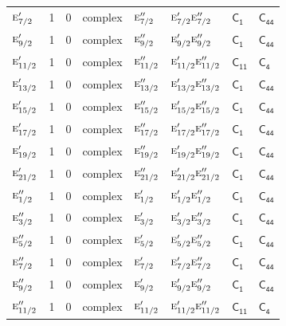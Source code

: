 \documentclass[10pt,a4paper]{article}
\numberwithin{equation}{section}
\newcommand{\grp}[1]{\mathsf{#1}}
\newcommand{\irr}[1]{\text{\normalfont\scshape #1}}
\begin{document}
{\begin{longtable}{@{}lrrlllll@{}}
$\irr{e}_{7/2}'$ & 1 & $0$ & complex & $\irr{e}_{7/2}''$ & $\irr{e}_{7/2}'\irr{e}_{7/2}''$ & \href{C1.pdf}{$\grp{C_{1}}$} & $\grp{C_{44}}$\\
$\irr{e}_{9/2}'$ & 1 & $0$ & complex & $\irr{e}_{9/2}''$ & $\irr{e}_{9/2}'\irr{e}_{9/2}''$ & \href{C1.pdf}{$\grp{C_{1}}$} & $\grp{C_{44}}$\\
$\irr{e}_{11/2}'$ & 1 & $0$ & complex & $\irr{e}_{11/2}''$ & $\irr{e}_{11/2}'\irr{e}_{11/2}''$ & \href{C11.pdf}{$\grp{C_{11}}$} & \href{../../../rotation/data/pdf/C4.pdf}{$\grp{C_{4}}$}\\
$\irr{e}_{13/2}'$ & 1 & $0$ & complex & $\irr{e}_{13/2}''$ & $\irr{e}_{13/2}'\irr{e}_{13/2}''$ & \href{C1.pdf}{$\grp{C_{1}}$} & $\grp{C_{44}}$\\
$\irr{e}_{15/2}'$ & 1 & $0$ & complex & $\irr{e}_{15/2}''$ & $\irr{e}_{15/2}'\irr{e}_{15/2}''$ & \href{C1.pdf}{$\grp{C_{1}}$} & $\grp{C_{44}}$\\
$\irr{e}_{17/2}'$ & 1 & $0$ & complex & $\irr{e}_{17/2}''$ & $\irr{e}_{17/2}'\irr{e}_{17/2}''$ & \href{C1.pdf}{$\grp{C_{1}}$} & $\grp{C_{44}}$\\
$\irr{e}_{19/2}'$ & 1 & $0$ & complex & $\irr{e}_{19/2}''$ & $\irr{e}_{19/2}'\irr{e}_{19/2}''$ & \href{C1.pdf}{$\grp{C_{1}}$} & $\grp{C_{44}}$\\
$\irr{e}_{21/2}'$ & 1 & $0$ & complex & $\irr{e}_{21/2}''$ & $\irr{e}_{21/2}'\irr{e}_{21/2}''$ & \href{C1.pdf}{$\grp{C_{1}}$} & $\grp{C_{44}}$\\
$\irr{e}_{1/2}''$ & 1 & $0$ & complex & $\irr{e}_{1/2}'$ & $\irr{e}_{1/2}'\irr{e}_{1/2}''$ & \href{C1.pdf}{$\grp{C_{1}}$} & $\grp{C_{44}}$\\
$\irr{e}_{3/2}''$ & 1 & $0$ & complex & $\irr{e}_{3/2}'$ & $\irr{e}_{3/2}'\irr{e}_{3/2}''$ & \href{C1.pdf}{$\grp{C_{1}}$} & $\grp{C_{44}}$\\
$\irr{e}_{5/2}''$ & 1 & $0$ & complex & $\irr{e}_{5/2}'$ & $\irr{e}_{5/2}'\irr{e}_{5/2}''$ & \href{C1.pdf}{$\grp{C_{1}}$} & $\grp{C_{44}}$\\
$\irr{e}_{7/2}''$ & 1 & $0$ & complex & $\irr{e}_{7/2}'$ & $\irr{e}_{7/2}'\irr{e}_{7/2}''$ & \href{C1.pdf}{$\grp{C_{1}}$} & $\grp{C_{44}}$\\
$\irr{e}_{9/2}''$ & 1 & $0$ & complex & $\irr{e}_{9/2}'$ & $\irr{e}_{9/2}'\irr{e}_{9/2}''$ & \href{C1.pdf}{$\grp{C_{1}}$} & $\grp{C_{44}}$\\
$\irr{e}_{11/2}''$ & 1 & $0$ & complex & $\irr{e}_{11/2}'$ & $\irr{e}_{11/2}'\irr{e}_{11/2}''$ & \href{C11.pdf}{$\grp{C_{11}}$} & \href{../../../rotation/data/pdf/C4.pdf}{$\grp{C_{4}}$}\\

\end{longtable}}
\end{document}
